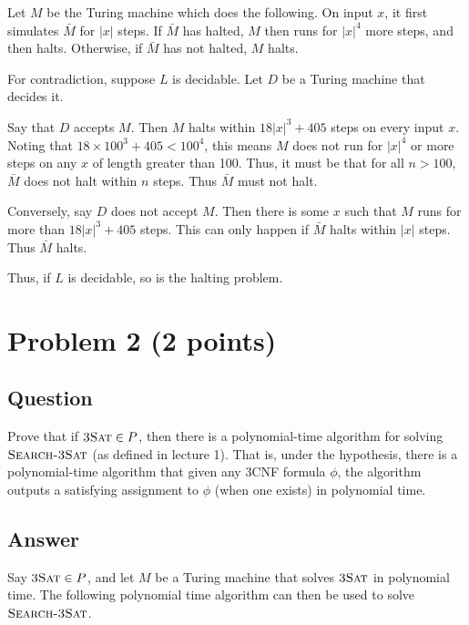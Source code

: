 \documentclass{article}
\begin{document}
	Let $M$ be the Turing machine which does the following.  On input $x$, it first simulates $\bar{M}$ for $|x|$ steps.  If $\bar{M}$ has halted, $M$ then runs for $|x|^4$ more steps, and then halts.  Otherwise, if $\bar{M}$ has not halted, $M$ halts.

	For contradiction, suppose $L$ is decidable.  Let $D$ be a Turing machine that decides it.
	
	Say that $D$ accepts $M$.  Then $M$ halts within $18|x|^3 + 405$ steps on every input $x$.  Noting that $18 \times 100^3 + 405 < 100^4$, this means $M$ does not run for $|x|^4$ or more steps on any $x$ of length greater than 100.	Thus, it must be that for all $n > 100$, $\bar{M}$ does not halt within $n$ steps.  Thus $\bar{M}$ must not halt.

	Conversely, say $D$ does not accept $M$.  Then there is some $x$ such that $M$ runs for more than $18|x|^3 + 405$ steps.  This can only happen if $\bar{M}$ halts within $|x|$ steps.  Thus $\bar{M}$ halts.

	Thus, if $L$ is decidable, so is the halting problem.

    \section*{Problem 2 (2 points)}

	\subsection*{Question}

    Prove that if $\text{\sc 3Sat} \in P$, then there is a polynomial-time algorithm for solving $\text{\sc Search-3Sat}$ (as defined in lecture 1). That is, under the hypothesis, there is a polynomial-time algorithm that given any 3CNF formula $\phi$, the algorithm outputs a satisfying assignment to $\phi$ (when one exists) in polynomial time.
 
	\subsection*{Answer}


	Say $\text{\sc 3Sat} \in P$, and let $M$ be a Turing machine that solves $\text{\sc 3Sat}$ in polynomial time.  The following polynomial time algorithm can then be used to solve $\text{\sc Search-3Sat}$.
\end{document}
